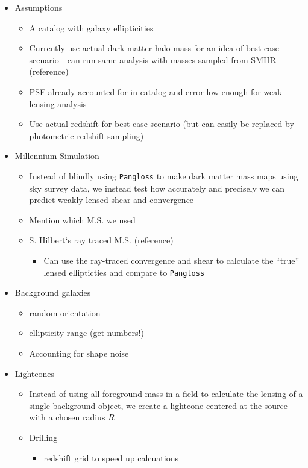 \documentclass[%
 reprint,
 amsmath,amssymb,
 aps,
]{revtex4-1}
\begin{document}
\begin{itemize}
\item Assumptions
    \begin{itemize}
    \item A catalog with galaxy ellipticities
    \item Currently use actual dark matter halo mass for an idea of best case scenario - can run same analysis with masses sampled from SMHR (reference)
    \item PSF already accounted for in catalog and error low enough for weak lensing analysis
    \item Use actual redshift for best case scenario (but can easily be replaced by photometric redshift sampling)
    \end{itemize}
\item Millennium Simulation
    \begin{itemize}
    \item Instead of blindly using \texttt{Pangloss} to make dark matter mass maps using sky survey data, we instead test how accurately and precisely we can predict weakly-lensed shear and convergence 
    \item Mention which M.S. we used
    \item S. Hilbert`s ray traced M.S. (reference)
        \begin{itemize}
        \item Can use the ray-traced convergence and shear to calculate the ``true'' lensed ellipticties and compare to \texttt{Pangloss}
        \end{itemize}
    \end{itemize}
\item Background galaxies
    \begin{itemize}
    \item random orientation
    \item ellipticity range (get numbers!)
    \item Accounting for shape noise
    \end{itemize}
\item Lightcones
    \begin{itemize}
    \item Instead of using all foreground mass in a field to calculate the lensing of a single background object, we create a lightcone centered at the source with a chosen radius $R$
    \item Drilling
        \begin{itemize}
        \item redshift grid to speed up calcuations

\end{itemize}
\end{itemize}
\end{itemize}
\end{document}
